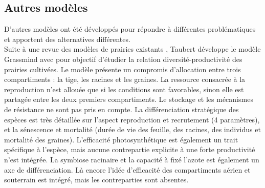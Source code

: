 \documentclass[french]{article}
\begin{document}
{ 
%

\subsection{Autres modèles}
D'autres modèles ont été développés pour répondre à différentes problématiques et apportent des alternatives différentes.\\

\indent Suite à une revue des modèles de prairies existants \cite{Taubert2012}, Taubert développe le modèle Grassmind \cite{Taubert2014} avec pour objectif d'étudier la relation diversité-productivité des prairies cultivées. Le modèle présente un compromis d'allocation entre trois compartiments : la tige, les racines et les graines. La ressource consacrée à la reproduction n'est allouée que si les conditions sont favorables, sinon elle est partagée entre les deux premiers compartiments. Le stockage et les mécanismes de résistance ne sont pas pris en compte. La différenciation stratégique des espèces est très détaillée sur l'aspect reproduction et recrutement (4 paramètres), et la sénescence et mortalité (durée de vie des feuille, des racines, des individus et mortalité des graines). L'efficacité photosynthétique est également un trait spécifique à l'espèce, mais aucune contrepartie explicite à une forte productivité n'est intégrée. La symbiose racinaire et la capacité à fixé l'azote est également un axe de différenciation. Là encore l'idée d'efficacité des compartiments aérien et souterrain est intégré, mais les contreparties sont absentes.\\

}
\end{document}
